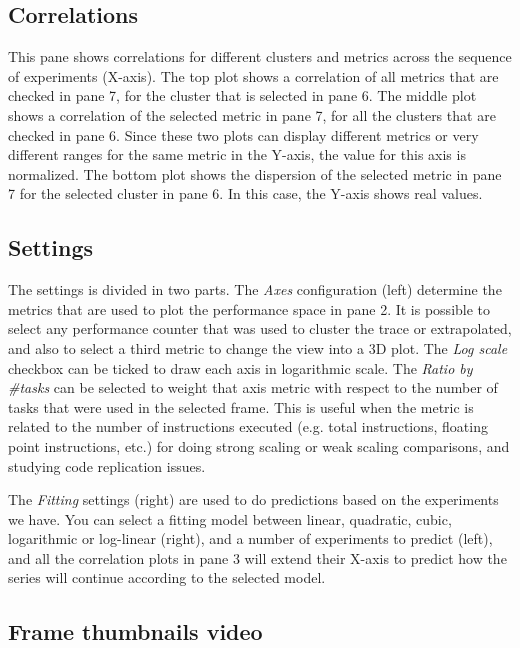 \documentclass[twoside,a4,english,11pt]{book}
\begin{document}
\subsection{Correlations}

This pane shows correlations for different clusters and metrics across the sequence of experiments (X-axis). The top plot shows a 
correlation of all metrics that are checked in pane 7, for the cluster that is selected in pane 6. The middle plot shows a correlation 
of the selected metric in pane 7, for all the clusters that are checked in pane 6. Since these two plots can display different metrics 
or very different ranges for the same metric in the Y-axis, the value for this axis is normalized. The bottom plot shows the dispersion 
of the selected metric in pane 7 for the selected cluster in pane 6. In this case, the Y-axis shows real values. 

\subsection{Settings}

The settings is divided in two parts. The \emph{Axes} configuration (left) determine the metrics that are used to plot the 
performance space in pane 2. It is possible to select any performance counter that was used to cluster the trace or extrapolated, 
and also to select a third metric to change the view into a 3D plot. The \emph{Log scale} checkbox can be ticked to draw each
axis in logarithmic scale. The \emph{Ratio by \#tasks} can be selected to weight that axis metric with respect to the number 
of tasks that were used in the selected frame. This is useful when the metric is related to the number of instructions executed 
(e.g. total instructions, floating point instructions, etc.) for doing strong scaling or weak scaling comparisons, and studying
code replication issues.

The \emph{Fitting} settings (right) are used to do predictions based on the experiments we have. You can select a fitting model 
between linear, quadratic, cubic, logarithmic or log-linear (right), and a number of experiments to predict (left), and all 
the correlation plots in pane 3 will extend their X-axis to predict how the series will continue according to the selected model.

\subsection{Frame thumbnails video}
\end{document}
